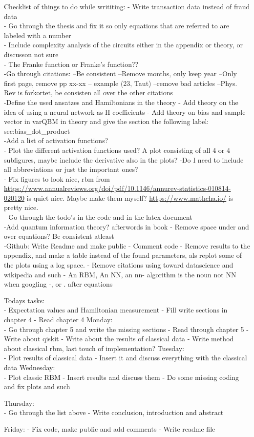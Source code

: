 \documentclass[../main.tex]{subfiles}
\begin{document}
Checklist of things to do while writiting:
- Write transaction data instead of fraud data\\
- Go through the thesis and fix it so only equations that are referred to are labeled with a number\\
- Include complexity analysis of the circuits either in the appendix or theory, or discusson not sure\\
- The Franke function or Franke's function??\\
-Go through citations:
    --Be consistent
    --Remove months, only keep year
    --Only first page, remove pp xx-xx
    -- example (23, Taut)
    --remove bad articles
    --Phys. Rev is forkortet, be consisten all over the other citations\\
-Define the used ansatzes and Hamiltonians in the theory
- Add theory on the idea of using a neural network as H coefficients
- Add theory on bias and sample vector in varQBM in theory and give the section the following label: sec:bias\_dot\_product\\
-Add a list of activation functions?\\
- Plot the different activation functions used? A plot consisting of all 4 or 4 subfigures, maybe include the derivative also in the plots?
-Do I need to include all abbreviations or just the important ones?\\
- Fix figures to look nice, rbm from  \url{https://www.annualreviews.org/doi/pdf/10.1146/annurev-statistics-010814-020120} is quiet nice. Maybe make them myself? \url{https://www.mathcha.io/} is pretty nice.\\
- Go through the todo's in the code and in the latex document\\
-Add quantum information theory? afterwords in book
- Remove space under and over equations? Be consistent atleast\\
-Github: Write Readme and make public
- Comment code
- Remove results to the appendix, and make a table instead of the found parameters, als replot some of the plots using a log space.
- Remove citations using toward datascience and wikipedia and such
- An RBM, An NN, an nn- algorithm is the noun not NN when googling
-, or . after equations

Todays tasks:\\
- Expectation values and Hamiltonian measurement
- Fill write sections in chapter 4
- Read chapter 4
Monday:\\
- Go through chapter 5 and write the missing sections
- Read through chapter 5
- Write about qiskit
- Write about the results of classical data
- Write method about classical rbm, last touch of implementation?
Tuesday:\\
- Plot results of classical data
- Insert it and discuss everything with the classical data
Wednesday:\\
- Plot classic RBM
- Insert results and discuss them
- Do some missing coding and fix plots and such

Thursday:\\
- Go through the list above
- Write conclusion, introduction and abstract

Friday:
- Fix code, make public and add comments
- Write readme file
\end{document}
